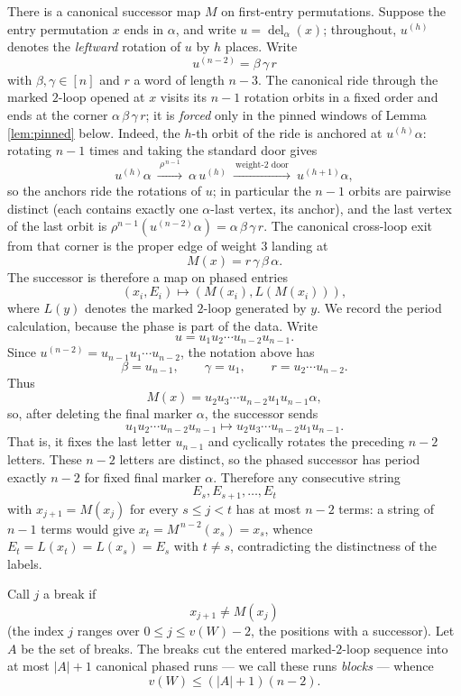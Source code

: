 \documentclass[11pt]{article}
\begin{document}
There is a canonical successor map \(M\) on first-entry permutations.  Suppose the entry
permutation \(x\) ends in \(\alpha\), and write \(u=\operatorname{del}_\alpha(x)\); throughout,
\(u^{(h)}\) denotes the \emph{leftward} rotation of \(u\) by \(h\) places.  Write
\[
  u^{(n-2)}=\beta\,\gamma\,r
\]
with \(\beta,\gamma\in[n]\) and \(r\) a word of length \(n-3\).  The canonical ride through
the marked \(2\)-loop opened at \(x\) visits its \(n-1\) rotation orbits in a fixed order
and ends at the corner \(\alpha\,\beta\,\gamma\,r\); it is \emph{forced} only in the pinned
windows of Lemma \ref{lem:pinned} below.  Indeed, the \(h\)-th orbit of the ride is
anchored at \(u^{(h)}\alpha\): rotating \(n-1\) times and taking the standard door gives
\[
  u^{(h)}\alpha
  \ \xrightarrow{\ \rho^{\,n-1}\ }\
  \alpha\,u^{(h)}
  \ \xrightarrow{\ \text{weight-\(2\) door}\ }\
  u^{(h+1)}\alpha ,
\]
so the anchors ride the rotations of \(u\); in particular the \(n-1\) orbits are pairwise
distinct (each contains exactly one \(\alpha\)-last vertex, its anchor), and the last vertex of
the last orbit is \(\rho^{n-1}(u^{(n-2)}\alpha)=\alpha\,\beta\,\gamma\,r\).  The canonical
cross-loop exit from that corner is the proper edge of weight \(3\) landing at
\[
  M(x)=r\,\gamma\,\beta\,\alpha .
\]
The successor is therefore a map on phased entries
\[
  (x_i,E_i)\longmapsto (M(x_i),L(M(x_i))),
\]
where \(L(y)\) denotes the marked \(2\)-loop generated by \(y\).  We record the period calculation,
because the phase is part of the data.  Write
\[
  u=u_1u_2\cdots u_{n-2}u_{n-1} .
\]
Since \(u^{(n-2)}=u_{n-1} u_1\cdots u_{n-2}\), the notation above has
\[
  \beta=u_{n-1},\qquad \gamma=u_1,\qquad r=u_2\cdots u_{n-2}.
\]
Thus
\[
  M(x)=u_2u_3\cdots u_{n-2}u_1u_{n-1} \alpha,
\]
so, after deleting the final marker \(\alpha\), the successor sends
\[
  u_1u_2\cdots u_{n-2}u_{n-1}
  \longmapsto
  u_2u_3\cdots u_{n-2}u_1u_{n-1} .
\]
That is, it fixes the last letter \(u_{n-1}\) and cyclically rotates the preceding \(n-2\)
letters.  These \(n-2\) letters are distinct, so the phased successor has period exactly \(n-2\)
for fixed final marker \(\alpha\).  Therefore any consecutive string
\[
  E_s,E_{s+1},\ldots,E_t
\]
with \(x_{j+1}=M(x_j)\) for every \(s\le j<t\) has at most \(n-2\) terms: a string of \(n-1\)
terms would give \(x_t=M^{\,n-2}(x_s)=x_s\), whence \(E_t=L(x_t)=L(x_s)=E_s\) with \(t\ne s\),
contradicting the distinctness of the labels.

Call \(j\) a break if
\[
  x_{j+1}\ne M(x_j)
\]
(the index \(j\) ranges over \(0\le j\le v(W)-2\), the positions with a successor).  Let
\(A\) be the set of breaks.  The breaks cut the entered marked-\(2\)-loop sequence into at most
\(|A|+1\) canonical phased runs --- we call these runs \emph{blocks} --- whence
\[
  v(W)\le (|A|+1)(n-2). \tag{3}
\]
\end{document}
